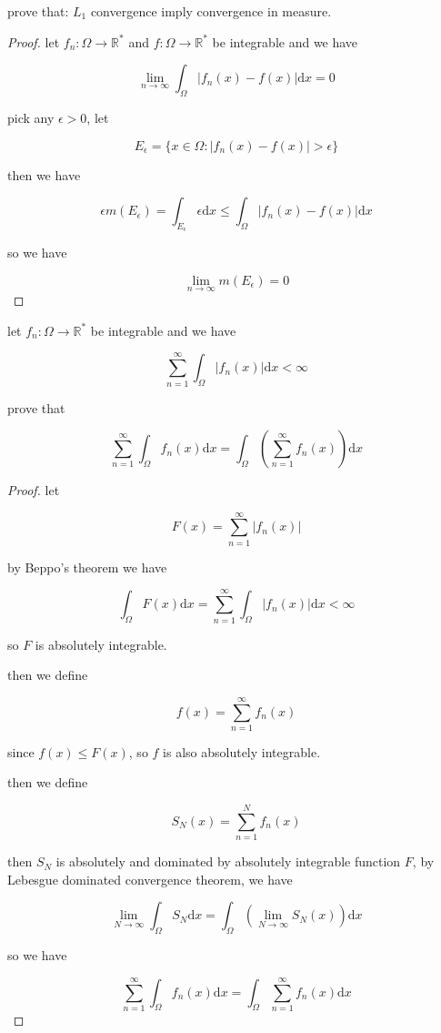 \documentclass[11pt,a4paper]{article}
\begin{document}
\begin{exercise}
    prove that: $L_1$ convergence imply convergence in measure.
\end{exercise}

\begin{proof}
    let $f_n: \Omega \to \mathbb{R}^*$ and $f: \Omega \to \mathbb{R}^*$ be integrable and we have

    \[
        \lim_{n \to \infty}\int_{\Omega}\left| f_n(x) - f(x)\right| \mathrm{d}x = 0
    \]

    pick any $\epsilon > 0$, let

    \[
        E_{\epsilon} = \{ x \in \Omega : \left| f_n(x) - f(x)\right| > \epsilon \}
    \]

    then we have

    \[
\epsilon m(E_{\epsilon})  = \int_{E_{\epsilon}} \epsilon \mathrm{d}x \le \int_{\Omega}\left| f_n(x) - f(x)\right| \mathrm{d}x
    \]

    so we have

    \[
        \lim_{n \to \infty}m(E_{\epsilon}) = 0
    \]
\end{proof}

\begin{exercise}
    let $f_n: \Omega \to \mathbb{R}^*$ be integrable and we have

    \[
        \sum_{n=1}^{\infty} \int_{\Omega} \lvert f_n(x) \rvert \mathrm{d}x < \infty
    \]

    prove that

    \[
        \sum_{n=1}^{\infty} \int_{\Omega}  f_n(x)  \mathrm{d}x  =  \int_{\Omega}\left( \sum_{n=1}^{\infty} f_n(x) \right) \mathrm{d}x
    \]
\end{exercise}

\begin{proof}
    let 

    \[
        F(x) = \sum_{n=1}^{\infty} \lvert f_n(x) \rvert
    \]

    by Beppo's theorem we have

    \[
        \int_{\Omega}F(x)\mathrm{d}x = \sum_{n=1}^{\infty} \int_{\Omega} \lvert f_n(x)\rvert  \mathrm{d}x < \infty
    \]

    so $F$ is absolutely integrable.

    then we define

    \[
        f(x) = \sum_{n=1}^{\infty}f_n(x)
    \]

    since $f(x) \le F(x)$, so $f$ is also absolutely integrable.

    then we define

    \[
        S_N(x) = \sum_{n=1}^{N}f_n(x)
    \]

    then $S_N$ is absolutely and dominated by absolutely integrable function $F$, by Lebesgue dominated convergence theorem, we have

    \[
        \lim_{N \to \infty} \int_{\Omega}S_N \mathrm{d}x = \int_{\Omega}\left( \lim_{N \to \infty}S_N(x) \right) \mathrm{d}x
    \]

    so we have

    \[
        \sum_{n=1}^{\infty} \int_{\Omega} f_n(x) \mathrm{d}x =  \int_{\Omega} \sum_{n=1}^{\infty} f_n(x) \mathrm{d}x
    \]

\end{proof}
\end{document}
